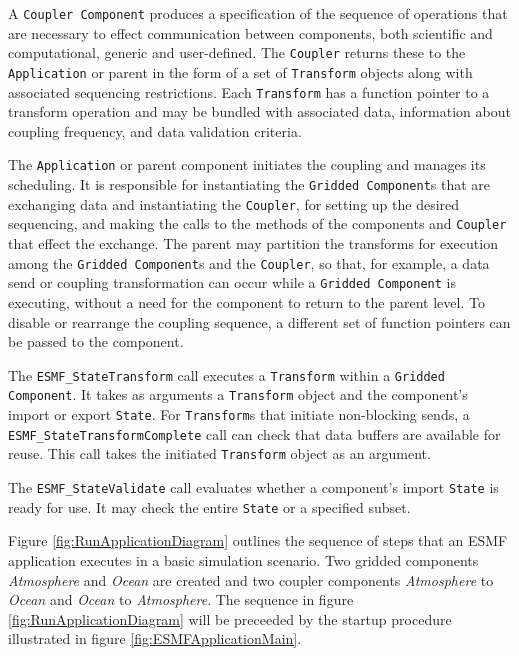 A {\tt Coupler Component} produces a specification of the sequence of 
operations that are necessary to effect communication between components, 
both scientific and computational, generic and user-defined.  The {\tt Coupler} 
returns these to the {\tt Application} or parent in the form of a set of {\tt Transform} objects 
along with associated sequencing restrictions.  Each {\tt Transform} has a
function pointer to a transform operation and may be bundled with 
associated data, information about coupling frequency, and 
data validation criteria.

The {\tt Application} or parent component initiates the coupling and manages 
its scheduling.  It is responsible for instantiating the {\tt Gridded Component}s
that are exchanging data and instantiating the {\tt Coupler}, for setting up the desired 
sequencing, and making the calls to the methods of the components and 
{\tt Coupler} that effect the exchange.  The parent may partition the 
transforms
for execution among the {\tt Gridded Component}s and the {\tt Coupler}, so that, for 
example, a data send or coupling transformation can occur while a {\tt Gridded 
Component} is executing, without a need for the component to return to the
parent level.  
To disable or rearrange the coupling sequence, a different set of function
pointers can be passed to the component.

The {\tt ESMF\_StateTransform} call executes a {\tt Transform} 
within a {\tt Gridded Component}.  It takes as arguments a
{\tt Transform} object and the component's import or export {\tt State}.  
For {\tt Transform}s that initiate non-blocking sends, a {\tt ESMF\_StateTransformComplete} 
call can check that data  buffers are available for reuse.  This 
call takes the initiated {\tt Transform} object as an argument.

The {\tt ESMF\_StateValidate} call evaluates whether a component's 
import {\tt State} is ready for use.  It may check the entire {\tt State} or 
a specified subset.

Figure \ref{fig:RunApplicationDiagram} outlines the sequence of steps that an ESMF application
executes in a basic simulation scenario. Two gridded components {\it Atmosphere} and {\it Ocean}
are created and two coupler components {\it Atmosphere} to {\it Ocean} and {\it Ocean} to {\it Atmosphere}.
The sequence in figure \ref{fig:RunApplicationDiagram} will be preceeded by the startup procedure illustrated
in figure \ref{fig:ESMFApplicationMain}.

